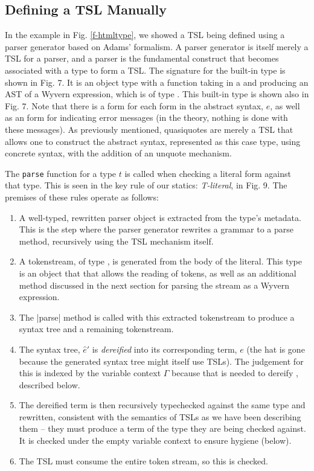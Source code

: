 \subsection{Defining a TSL Manually}
In the example in Fig. \ref{f-htmltype}, we showed a TSL being defined using a parser generator based on Adams' formalism. A parser generator is itself merely a TSL for a parser, and a parser is the fundamental construct that becomes associated with a type to form a TSL. The signature for the built-in type  is shown in Fig. 7. It is an object type with a  function taking in a  and producing an AST of a Wyvern expression, which is of type . This built-in type is shown also in Fig. 7. Note that there is a form for each form in the abstract syntax, $e$, as well as an  form for indicating error messages (in the theory, nothing is done with these messages). As previously mentioned, quasiquotes are merely a TSL that allows one to construct the abstract syntax, represented as this case type, using concrete syntax, with the addition of an unquote mechanism.

The \verb|parse| function for a type $t$ is called when checking a literal form against that type. This is seen in the key rule of our statics: \textit{T-literal}, in Fig. 9. The premises of these rules operate as follows:
\begin{enumerate}
\item A well-typed, rewritten parser object is extracted from the type's metadata. This is the step where the parser generator rewrites a grammar to a parse method, recursively using the TSL mechanism itself.
\item A tokenstream, of type , is generated from the body of the literal. This type is an object that that allows the reading of tokens, as well as an additional method discussed in the next section for parsing the stream as a Wyvern expression.
\item The \li|parse| method is called with this extracted tokenstream to produce a syntax tree and a remaining tokenstream.
\item The syntax tree, $\hat{e}'$ is \emph{dereified} into its corresponding term, $e$ (the hat is gone because the generated syntax tree might itself use TSLs). The judgement for this is indexed by the variable context $\Gamma$ because that is needed to dereify , described below.
\item The dereified term is then recursively typechecked against the same type and rewritten, consistent with the semantics of TSLs as we have been describing them -- they must produce a term of the type they are being checked against. It is checked under the empty variable context to ensure hygiene (below).
\item The TSL must consume the entire token stream, so this is checked.
\end{enumerate}

